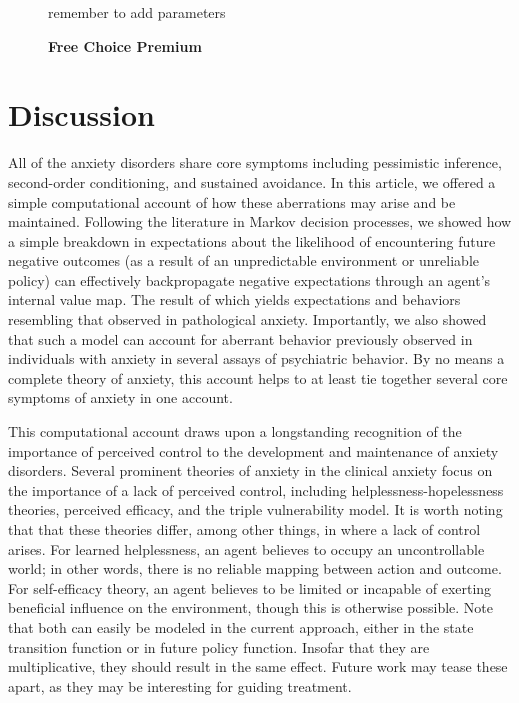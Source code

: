 \documentclass[11pt]{article} %
\begin{document}
\begin{figure}
  \centerline{%
  }
  \caption{\textbf{Free Choice Premium}}
  \par remember to add parameters
\end{figure}

\section{Discussion}

All of the anxiety disorders share core symptoms including pessimistic inference,
second-order conditioning, and sustained avoidance. In this article, we offered
a simple computational account of how these aberrations may arise and be maintained.
Following the literature in Markov decision processes, we showed how a simple
breakdown in expectations about the likelihood of encountering future negative
outcomes (as a result of an unpredictable environment or unreliable policy) can
effectively backpropagate negative expectations through an agent's internal value
map. The result of which yields expectations and behaviors resembling that observed
in pathological anxiety. Importantly, we also showed that such a model can account
for aberrant behavior previously observed in individuals with anxiety in several
assays of psychiatric behavior. By no means a complete theory of anxiety, this
account helps to at least tie together several core symptoms of anxiety in one
account.

This computational account draws upon a longstanding recognition of the importance
of perceived control to the development and maintenance of anxiety disorders. Several
prominent theories of anxiety in the clinical anxiety focus on the importance of
a lack of perceived control, including helplessness-hopelessness theories, perceived
efficacy, and the triple vulnerability model. It is worth noting that that these
theories differ, among other things, in where a lack of control arises. For learned
helplessness, an agent believes to occupy an uncontrollable world; in other words,
there is no reliable mapping between action and outcome. For self-efficacy theory,
an agent believes to be limited or incapable of exerting beneficial influence on
the environment, though this is otherwise possible. Note that both can easily be
modeled in the current approach, either in the state transition function or in
future policy function. Insofar that they are multiplicative, they should result
in the same effect. Future work may tease these apart, as they may be interesting
for guiding treatment.
\end{document}
